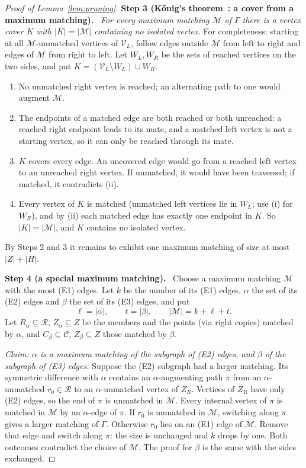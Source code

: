 \documentclass[11pt]{article}
\theoremstyle{remark}
\newcommand{\abs}[1]{\lvert #1\rvert}
\newcommand{\step}[1]{\par\medskip\noindent\textbf{Step #1.}\ }
\begin{document}
\begin{proof}[Proof of Lemma~\ref{lem:pruning}]
\step{3 (K\H{o}nig's theorem~\cite{konig1931}: a cover from a maximum matching)}
\emph{For every maximum matching $\mathcal M$ of $\Gamma$ there is a vertex
cover $K$ with $\abs K=\abs{\mathcal M}$ containing no isolated vertex.}
For completeness: starting at all $\mathcal M$-unmatched vertices of
$\mathcal V_L$, follow edges outside $\mathcal M$ from left to right and edges
of $\mathcal M$ from right to left. Let $W_L,W_R$ be the sets of reached
vertices on the two sides, and put
$K=(\mathcal V_L\setminus W_L)\cup W_R$.
\begin{enumerate}[label=\textup{(\roman*)},leftmargin=2.4em,itemsep=1pt]
\item No unmatched right vertex is reached; an alternating path to one would
augment $\mathcal M$.
\item The endpoints of a matched edge are both reached or both unreached: a
reached right endpoint leads to its mate, and a matched left vertex is not a
starting vertex, so it can only be reached through its mate.
\item $K$ covers every edge. An uncovered edge would go from a reached left
vertex to an unreached right vertex. If unmatched, it would have been
traversed; if matched, it contradicts (ii).
\item Every vertex of $K$ is matched (unmatched left vertices lie in $W_L$;
use (i) for $W_R$), and by (ii) each matched edge has exactly one endpoint in
$K$. So $\abs K=\abs{\mathcal M}$, and $K$ contains no isolated vertex.
\end{enumerate}
By Steps 2 and 3 it remains to exhibit one maximum matching of size at most
$\abs Z+\abs H$.

\step{4 (a special maximum matching)}
Choose a maximum matching $\mathcal M$ with the most (E1) edges. Let $k$ be
the number of its (E1) edges, $\alpha$ the set of its (E2) edges and $\beta$
the set of its (E3) edges, and put
\[
 \ell=\abs\alpha,\qquad t=\abs\beta,
 \qquad\abs{\mathcal M}=k+\ell+t.
\]
Let $R_\alpha\subseteq\mathcal R$, $Z_\alpha\subseteq Z$ be the members and
the points (via right copies) matched by $\alpha$, and
$C_\beta\subseteq\mathcal C$, $Z_\beta\subseteq Z$ those matched by $\beta$.

\emph{Claim: $\alpha$ is a maximum matching of the subgraph of \textup{(E2)}
edges, and $\beta$ of the subgraph of \textup{(E3)} edges.}
Suppose the (E2) subgraph had a larger matching. Its symmetric difference with
$\alpha$ contains an $\alpha$-augmenting path $\pi$ from an
$\alpha$-unmatched $r_0\in\mathcal R$ to an $\alpha$-unmatched vertex of
$Z_R$. Vertices of $Z_R$ have only (E2) edges, so the end of $\pi$ is
unmatched in $\mathcal M$. Every internal vertex of $\pi$ is matched in
$\mathcal M$ by an $\alpha$-edge of $\pi$. If $r_0$ is unmatched in
$\mathcal M$, switching along $\pi$ gives a larger matching of $\Gamma$.
Otherwise $r_0$ lies on an (E1) edge of $\mathcal M$. Remove that edge and
switch along $\pi$: the size is unchanged and $k$ drops by one. Both outcomes
contradict the choice of $\mathcal M$. The proof for $\beta$ is the same with
the sides exchanged.


\end{proof}
\end{document}
